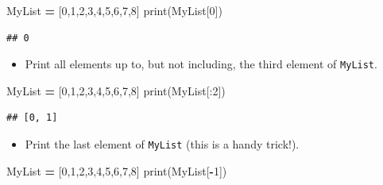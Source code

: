 \documentclass[
]{book}
\newenvironment{Shaded}{\begin{snugshade}}{\end{snugshade}}
\newcommand{\BuiltInTok}[1]{#1}
\newcommand{\DecValTok}[1]{\textcolor[rgb]{0.00,0.00,0.81}{#1}}
\newcommand{\NormalTok}[1]{#1}
\newcommand{\OperatorTok}[1]{\textcolor[rgb]{0.81,0.36,0.00}{\textbf{#1}}}
\providecommand{\tightlist}{%
  \setlength{\itemsep}{0pt}\setlength{\parskip}{0pt}}
\theoremstyle{definition}
\theoremstyle{definition}
\theoremstyle{definition}
\theoremstyle{remark}
\begin{document}
\begin{Shaded}
\begin{Highlighting}[]
\NormalTok{MyList }\OperatorTok{=}\NormalTok{ [}\DecValTok{0}\NormalTok{,}\DecValTok{1}\NormalTok{,}\DecValTok{2}\NormalTok{,}\DecValTok{3}\NormalTok{,}\DecValTok{4}\NormalTok{,}\DecValTok{5}\NormalTok{,}\DecValTok{6}\NormalTok{,}\DecValTok{7}\NormalTok{,}\DecValTok{8}\NormalTok{] }
\BuiltInTok{print}\NormalTok{(MyList[}\DecValTok{0}\NormalTok{]) }
\end{Highlighting}
\end{Shaded}

\begin{verbatim}
## 0
\end{verbatim}

\begin{itemize}
\tightlist
\item
  Print all elements up to, but not including, the third element of \texttt{MyList}.
\end{itemize}

\begin{Shaded}
\begin{Highlighting}[]
\NormalTok{MyList }\OperatorTok{=}\NormalTok{ [}\DecValTok{0}\NormalTok{,}\DecValTok{1}\NormalTok{,}\DecValTok{2}\NormalTok{,}\DecValTok{3}\NormalTok{,}\DecValTok{4}\NormalTok{,}\DecValTok{5}\NormalTok{,}\DecValTok{6}\NormalTok{,}\DecValTok{7}\NormalTok{,}\DecValTok{8}\NormalTok{] }
\BuiltInTok{print}\NormalTok{(MyList[:}\DecValTok{2}\NormalTok{])}
\end{Highlighting}
\end{Shaded}

\begin{verbatim}
## [0, 1]
\end{verbatim}

\begin{itemize}
\tightlist
\item
  Print the last element of \texttt{MyList} (this is a handy trick!).
\end{itemize}

\begin{Shaded}
\begin{Highlighting}[]
\NormalTok{MyList }\OperatorTok{=}\NormalTok{ [}\DecValTok{0}\NormalTok{,}\DecValTok{1}\NormalTok{,}\DecValTok{2}\NormalTok{,}\DecValTok{3}\NormalTok{,}\DecValTok{4}\NormalTok{,}\DecValTok{5}\NormalTok{,}\DecValTok{6}\NormalTok{,}\DecValTok{7}\NormalTok{,}\DecValTok{8}\NormalTok{] }
\BuiltInTok{print}\NormalTok{(MyList[}\OperatorTok{{-}}\DecValTok{1}\NormalTok{]) }
\end{Highlighting}
\end{Shaded}
\end{document}
